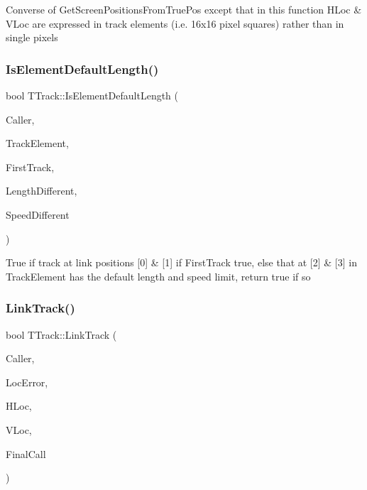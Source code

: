 Converse of Get\+Screen\+Positions\+From\+True\+Pos except that in this function H\+Loc \& V\+Loc are expressed in track elements (i.\+e. 16x16 pixel squares) rather than in single pixels \mbox{\label{class_t_track_a9519d6fa40b71bfcad4d5383634d73dd}} 
\subsubsection{\texorpdfstring{Is\+Element\+Default\+Length()}{IsElementDefaultLength()}}
{\footnotesize\ttfamily bool T\+Track\+::\+Is\+Element\+Default\+Length (\begin{DoxyParamCaption}\item[{int}]{Caller,  }\item[{\mbox{\hyperlink{class_t_track_element}{T\+Track\+Element}} \&}]{Track\+Element,  }\item[{bool}]{First\+Track,  }\item[{bool \&}]{Length\+Different,  }\item[{bool \&}]{Speed\+Different }\end{DoxyParamCaption})}

True if track at link positions \mbox{[}0\mbox{]} \& \mbox{[}1\mbox{]} if First\+Track true, else that at \mbox{[}2\mbox{]} \& \mbox{[}3\mbox{]} in Track\+Element has the default length and speed limit, return true if so \mbox{\label{class_t_track_a17b6095b0c8de0e1493eeebd6d534247}} 
\subsubsection{\texorpdfstring{Link\+Track()}{LinkTrack()}}
{\footnotesize\ttfamily bool T\+Track\+::\+Link\+Track (\begin{DoxyParamCaption}\item[{int}]{Caller,  }\item[{bool \&}]{Loc\+Error,  }\item[{int \&}]{H\+Loc,  }\item[{int \&}]{V\+Loc,  }\item[{bool}]{Final\+Call }\end{DoxyParamCaption})}

